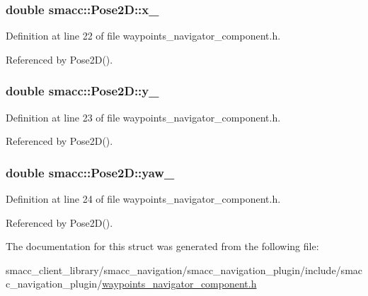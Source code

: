 \subsubsection[{\texorpdfstring{x\+\_\+}{x_}}]{\setlength{\rightskip}{0pt plus 5cm}double smacc\+::\+Pose2\+D\+::x\+\_\+}\hypertarget{structsmacc_1_1Pose2D_a8f876eecc29329305779a9fbe5e827bb}{}\label{structsmacc_1_1Pose2D_a8f876eecc29329305779a9fbe5e827bb}


Definition at line 22 of file waypoints\+\_\+navigator\+\_\+component.\+h.



Referenced by Pose2\+D().

\subsubsection[{\texorpdfstring{y\+\_\+}{y_}}]{\setlength{\rightskip}{0pt plus 5cm}double smacc\+::\+Pose2\+D\+::y\+\_\+}\hypertarget{structsmacc_1_1Pose2D_a29508b823676c1591fb5969858f1193a}{}\label{structsmacc_1_1Pose2D_a29508b823676c1591fb5969858f1193a}


Definition at line 23 of file waypoints\+\_\+navigator\+\_\+component.\+h.



Referenced by Pose2\+D().

\subsubsection[{\texorpdfstring{yaw\+\_\+}{yaw_}}]{\setlength{\rightskip}{0pt plus 5cm}double smacc\+::\+Pose2\+D\+::yaw\+\_\+}\hypertarget{structsmacc_1_1Pose2D_a79f207f922e6eed40846e6443456f7ba}{}\label{structsmacc_1_1Pose2D_a79f207f922e6eed40846e6443456f7ba}


Definition at line 24 of file waypoints\+\_\+navigator\+\_\+component.\+h.



Referenced by Pose2\+D().



The documentation for this struct was generated from the following file\+:\begin{DoxyCompactItemize}
\item 
smacc\+\_\+client\+\_\+library/smacc\+\_\+navigation/smacc\+\_\+navigation\+\_\+plugin/include/smacc\+\_\+navigation\+\_\+plugin/\hyperlink{waypoints__navigator__component_8h}{waypoints\+\_\+navigator\+\_\+component.\+h}\end{DoxyCompactItemize}
